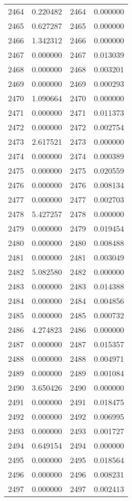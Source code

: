 \documentclass[12pt]{article}
\begin{document}
\begin{longtable}{@{}cccc@{}}
2464 & 0.220482 & 2464 & 0.000000 \\
2465 & 0.627287 & 2465 & 0.000000 \\
2466 & 1.342312 & 2466 & 0.000000 \\
2467 & 0.000000 & 2467 & 0.013039 \\
2468 & 0.000000 & 2468 & 0.003201 \\
2469 & 0.000000 & 2469 & 0.000293 \\
2470 & 1.090664 & 2470 & 0.000000 \\
2471 & 0.000000 & 2471 & 0.011373 \\
2472 & 0.000000 & 2472 & 0.002754 \\
2473 & 2.617521 & 2473 & 0.000000 \\
2474 & 0.000000 & 2474 & 0.000389 \\
2475 & 0.000000 & 2475 & 0.020559 \\
2476 & 0.000000 & 2476 & 0.008134 \\
2477 & 0.000000 & 2477 & 0.002703 \\
2478 & 5.427257 & 2478 & 0.000000 \\
2479 & 0.000000 & 2479 & 0.019454 \\
2480 & 0.000000 & 2480 & 0.008488 \\
2481 & 0.000000 & 2481 & 0.003049 \\
2482 & 5.082580 & 2482 & 0.000000 \\
2483 & 0.000000 & 2483 & 0.014388 \\
2484 & 0.000000 & 2484 & 0.004856 \\
2485 & 0.000000 & 2485 & 0.000732 \\
2486 & 4.274823 & 2486 & 0.000000 \\
2487 & 0.000000 & 2487 & 0.015357 \\
2488 & 0.000000 & 2488 & 0.004971 \\
2489 & 0.000000 & 2489 & 0.001084 \\
2490 & 3.650426 & 2490 & 0.000000 \\
2491 & 0.000000 & 2491 & 0.018475 \\
2492 & 0.000000 & 2492 & 0.006995 \\
2493 & 0.000000 & 2493 & 0.001727 \\
2494 & 0.649154 & 2494 & 0.000000 \\
2495 & 0.000000 & 2495 & 0.018564 \\
2496 & 0.000000 & 2496 & 0.008231 \\
2497 & 0.000000 & 2497 & 0.002413 \\

\end{longtable}
\end{document}
